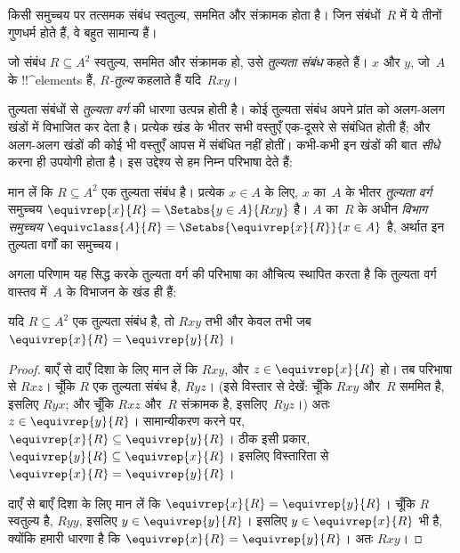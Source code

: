 \documentclass[../../../include/open-logic-section]{subfiles}
\begin{document}


किसी समुच्चय पर तत्समक संबंध स्वतुल्य, सममित और संक्रामक होता है। जिन
संबंधों~$R$ में ये तीनों गुणधर्म होते हैं, वे बहुत सामान्य हैं।

\begin{defn}[तुल्यता संबंध]
जो संबंध $R \subseteq A^2$ स्वतुल्य, सममित और संक्रामक हो, उसे
\emph{तुल्यता संबंध} कहते हैं। $x$ और $y$, जो~$A$ के !!^{element}s हैं,
\emph{$R$-तुल्य} कहलाते हैं यदि~$Rxy$।
\end{defn}

तुल्यता संबंधों से \emph{तुल्यता वर्ग} की धारणा उत्पन्न होती है। कोई
तुल्यता संबंध अपने प्रांत को अलग-अलग खंडों में विभाजित कर देता है। प्रत्येक
खंड के भीतर सभी वस्तुएँ एक-दूसरे से संबंधित होती हैं; और अलग-अलग खंडों की
कोई भी वस्तुएँ आपस में संबंधित नहीं होतीं। कभी-कभी इन खंडों की बात
\emph{सीधे} करना ही उपयोगी होता है। इस उद्देश्य से हम निम्न परिभाषा देते
हैं:

\begin{defn}
मान लें कि $R \subseteq A^2$ एक तुल्यता संबंध है। प्रत्येक $x \in A$ के
लिए, $x$ का~$A$ के भीतर \emph{तुल्यता वर्ग} समुच्चय $\equivrep{x}{R}
= \Setabs{y \in A}{Rxy}$ है। $A$ का~$R$ के अधीन \emph{विभाग समुच्चय}
$\equivclass{A}{R} = \Setabs{\equivrep{x}{R}}{x \in A}$ है, अर्थात इन
तुल्यता वर्गों का समुच्चय।
\end{defn}

अगला परिणाम यह सिद्ध करके तुल्यता वर्ग की परिभाषा का औचित्य स्थापित करता
है कि तुल्यता वर्ग वास्तव में~$A$ के विभाजन के खंड ही हैं:

\begin{prop}
यदि $R \subseteq A^2$ एक तुल्यता संबंध है, तो $Rxy$ तभी और केवल तभी जब
$\equivrep{x}{R} = \equivrep{y}{R}$।
\end{prop}

\begin{proof}
बाएँ से दाएँ दिशा के लिए मान लें कि $Rxy$, और $z \in
\equivrep{x}{R}$ हो। तब परिभाषा से $Rxz$। चूँकि $R$ एक तुल्यता संबंध है,
$Ryz$। (इसे विस्तार से देखें: चूँकि $Rxy$ और~$R$ सममित है, इसलिए $Ryx$;
और चूँकि $Rxz$ और~$R$ संक्रामक है, इसलिए~$Ryz$।) अतः $z \in \equivrep{y}{R}$।
सामान्यीकरण करने पर,
$\equivrep{x}{R} \subseteq \equivrep{y}{R}$। ठीक इसी प्रकार,
$\equivrep{y}{R} \subseteq \equivrep{x}{R}$। इसलिए विस्तारिता से
$\equivrep{x}{R} =
\equivrep{y}{R}$।

दाएँ से बाएँ दिशा के लिए मान लें कि $\equivrep{x}{R} =
\equivrep{y}{R}$। चूँकि $R$ स्वतुल्य है, $Ryy$, इसलिए $y \in
\equivrep{y}{R}$। इसलिए $y \in \equivrep{x}{R}$ भी है, क्योंकि हमारी
धारणा है कि $\equivrep{x}{R} = \equivrep{y}{R}$। अतः $Rxy$।
\end{proof}
\end{document}
